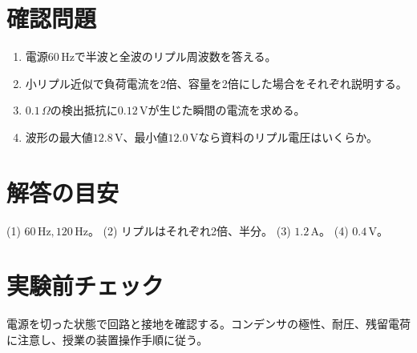 \documentclass[lualatex,a4paper,10pt]{jlreq}
\begin{document}
\clearpage
\clearpage
\section{確認問題}\label{sec:auto8}
\begin{enumerate}
\item 電源$60\,\mathrm{Hz}$で半波と全波のリプル周波数を答える。\answerline
\item 小リプル近似で負荷電流を2倍、容量を2倍にした場合をそれぞれ説明する。\answerline
\item $0.1\,\Omega$の検出抵抗に$0.12\,\mathrm{V}$が生じた瞬間の電流を求める。\answerline
\item 波形の最大値$12.8\,\mathrm{V}$、最小値$12.0\,\mathrm{V}$なら資料のリプル電圧はいくらか。\answerline
\end{enumerate}
\section*{解答の目安}\label{sec:auto9}
(1) $60\,\mathrm{Hz},120\,\mathrm{Hz}$。
(2) リプルはそれぞれ2倍、半分。
(3) $1.2\,\mathrm{A}$。
(4) $0.4\,\mathrm{V}$。
\section*{実験前チェック}\label{sec:auto10}
電源を切った状態で回路と接地を確認する。コンデンサの極性、耐圧、残留電荷に注意し、授業の装置操作手順に従う。
\prelabclosing
\end{document}
